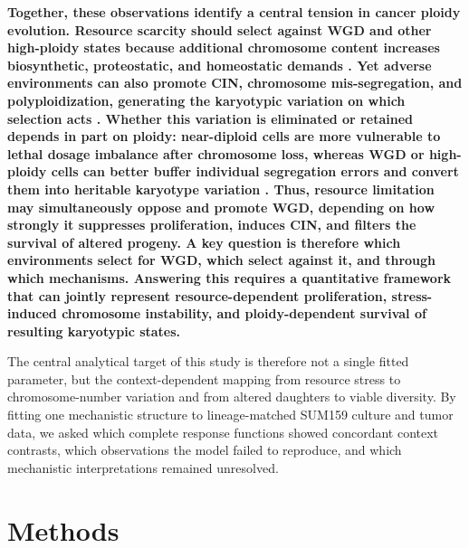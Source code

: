 \documentclass[11pt]{article}
\begin{document}
\textbf{Together, these observations identify a central tension in cancer ploidy evolution. Resource scarcity should select against WGD and other high-ploidy states because additional chromosome content increases biosynthetic, proteostatic, and homeostatic demands \cite{donovan_hyperdiploid_2014,nowicka_interactions_2025,beck_energetics_2025}. Yet adverse environments can also promote CIN, chromosome mis-segregation, and polyploidization, generating the karyotypic variation on which selection acts \cite{nowicka_interactions_2025,beck_energetics_2025}. Whether this variation is eliminated or retained depends in part on ploidy: near-diploid cells are more vulnerable to lethal dosage imbalance after chromosome loss, whereas WGD or high-ploidy cells can better buffer individual segregation errors and convert them into heritable karyotype variation \cite{lopez_interplay_2020,elizalde_markov_2018,santaguida_chromosome_2017,beck_alfa-k_2025}. Thus, resource limitation may simultaneously oppose and promote WGD, depending on how strongly it suppresses proliferation, induces CIN, and filters the survival of altered progeny. A key question is therefore which environments select for WGD, which select against it, and through which mechanisms. Answering this requires a quantitative framework that can jointly represent resource-dependent proliferation, stress-induced chromosome instability, and ploidy-dependent survival of resulting karyotypic states.}

The central analytical target of this study is therefore not a single fitted parameter, but the context-dependent mapping from resource stress to chromosome-number variation and from altered daughters to viable diversity. By fitting one mechanistic structure to lineage-matched SUM159 culture and tumor data, we asked which complete response functions showed concordant context contrasts, which observations the model failed to reproduce, and which mechanistic interpretations remained unresolved.

\section*{Methods}
\end{document}
